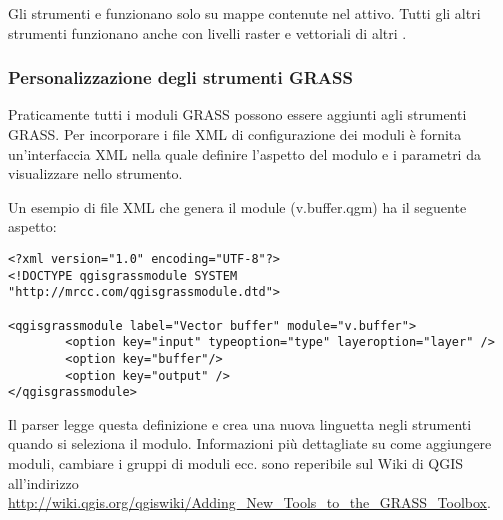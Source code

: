 Gli strumenti  e
 funzionano solo su
mappe contenute nel  attivo. Tutti gli altri strumenti
funzionano anche con livelli raster e vettoriali di altri .

\subsubsection{Personalizzazione degli strumenti GRASS} 
\label{sec:toolbox-customizing}

Praticamente tutti i moduli GRASS possono essere aggiunti agli strumenti
GRASS. Per incorporare i file XML di configurazione dei moduli è fornita
un'interfaccia XML nella quale definire l'aspetto del modulo e i parametri
da visualizzare nello strumento.

Un esempio di file XML che genera il module  (v.buffer.qgm)
ha il seguente aspetto:

\begin{verbatim}
<?xml version="1.0" encoding="UTF-8"?>
<!DOCTYPE qgisgrassmodule SYSTEM "http://mrcc.com/qgisgrassmodule.dtd">

<qgisgrassmodule label="Vector buffer" module="v.buffer">
        <option key="input" typeoption="type" layeroption="layer" />
        <option key="buffer"/>
        <option key="output" />
</qgisgrassmodule>
\end{verbatim}

Il parser legge questa definizione e crea una nuova linguetta negli strumenti
quando si seleziona il modulo. Informazioni più dettagliate su come aggiungere
moduli, cambiare i gruppi di moduli ecc. sono reperibile sul Wiki di QGIS
all'indirizzo \\
\url{http://wiki.qgis.org/qgiswiki/Adding\_New\_Tools\_to\_the\_GRASS\_Toolbox}.

